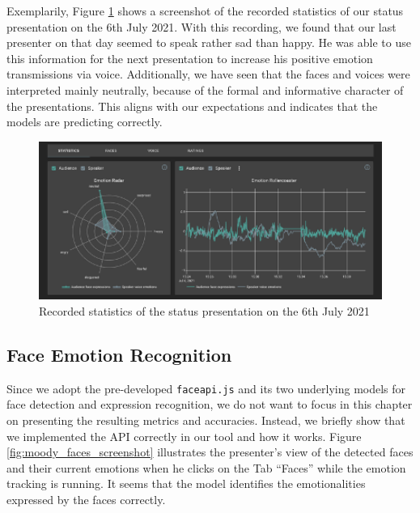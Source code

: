 Exemplarily, Figure \ref{fig:moody_statistics_screenshot} shows a screenshot of the recorded statistics of our status presentation on the 6th July 2021. With this recording, we found that our last presenter on that day seemed to speak rather sad than happy. He was able to use this information for the next presentation to increase his positive emotion transmissions via voice. Additionally, we have seen that the faces and voices were interpreted mainly neutrally, because of the formal and informative character of the presentations. This aligns with our expectations and indicates that the models are predicting correctly.

\begin{figure}
\centering
\includegraphics[width=1\textwidth]{assets/moody_statistics_screenshot.png}
\caption{Recorded statistics of the status presentation on the 6th July 2021}
\label{fig:moody_statistics_screenshot}
\end{figure}

\subsection{Face Emotion Recognition}
\label{subsec:results_face_emotion_recognition}
Since we adopt the pre-developed \texttt{faceapi.js} and its two underlying models for face detection and expression recognition, we do not want to focus in this chapter on presenting the resulting metrics and accuracies. Instead, we briefly show that we implemented the API correctly in our tool and how it works. Figure \ref{fig:moody_faces_screenshot} illustrates the presenter's view of the detected faces and their current emotions when he clicks on the Tab ``Faces'' while the emotion tracking is running. It seems that the model identifies the emotionalities expressed by the faces correctly.

